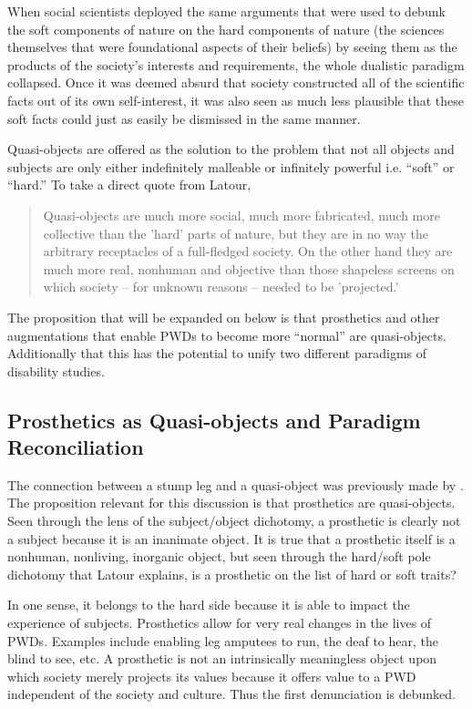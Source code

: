 \documentclass[a4paper]{article}
\begin{document}
When social scientists deployed the same arguments that were used to debunk
the soft components of nature on the hard components of nature (the sciences
themselves that were foundational aspects of their beliefs) by seeing them as
the products of the society's interests and requirements, the whole dualistic
paradigm collapsed. Once it was deemed absurd that society constructed all of
the scientific facts out of its own self-interest, it was also seen as much
less plausible that these soft facts could just as easily be dismissed in the
same manner.

Quasi-objects are offered as the solution to the problem that not all objects
and subjects are only either indefinitely malleable or infinitely powerful
i.e. ``soft'' or ``hard.'' To take a direct quote from Latour,

\begin{quote}
Quasi-objects are much more social, much more fabricated, much more
collective than the 'hard' parts of nature, but they are in no way the
arbitrary receptacles of a full-fledged society. On the other hand they are
much more real, nonhuman and objective than those shapeless screens on which
society – for unknown reasons – needed to be 'projected.' \cite{latour2012we}
\end{quote}

The proposition that will be expanded on below is that prosthetics and other
augmentations that enable PWDs to become more ``normal'' are quasi-objects.
Additionally that this has the potential to unify two different paradigms of
disability studies. 


\subsection{Prosthetics as Quasi-objects and Paradigm Reconciliation} 

The connection between a stump leg and a quasi-object was previously made by
\cite{bertram2018bestial}. The proposition relevant for this discussion is
that prosthetics are quasi-objects. Seen through the lens of the
subject/object dichotomy, a prosthetic is clearly not a subject because it is
an inanimate object. It is true that a prosthetic itself is a nonhuman,
nonliving, inorganic object, but seen through the hard/soft pole dichotomy
that Latour explains, is a prosthetic on the list of hard or soft traits? 

In one sense, it belongs to the hard side because it is able to impact the
experience of subjects. Prosthetics allow for very real changes in the lives
of PWDs. Examples include enabling leg amputees to run, the deaf to hear, the
blind to see, etc. A prosthetic is not an intrinsically meaningless object
upon which society merely projects its values because it offers value to a PWD
independent of the society and culture. Thus the first denunciation is
debunked.
\end{document}
